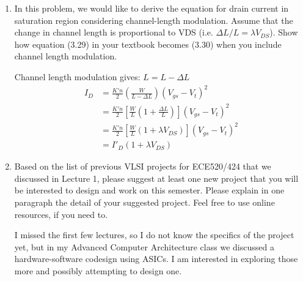 \documentclass[11pt]{article}
\begin{document}
\begin{enumerate}
    \item In this problem, we would like to derive the equation for drain current in saturation region considering channel-length modulation. Assume that the change in channel length is proportional to VDS (i.e. \(\Delta L / L = \lambda V_{DS}\)). Show how equation (3.29) in your textbook becomes (3.30) when you include channel length modulation.\vspace{1.5em}
    
    Channel length modulation gives: \( L = L - \Delta L\)
    \begin{align*}
        I_D &= \frac{K'n}{2} \left(\frac{W}{L-\Delta L}\right)\left(V_{gs}-V_t\right)^2\\[1em]
        &= \frac{K'n}{2}\left[ \frac{W}{L}\left(1+\frac{\Delta L}{L}\right)\right]\left(V_{gs}-V_t\right)^2\\[1em]
        &= \frac{K'n}{2}\left[ \frac{W}{L}\left(1+\lambda V_{DS}\right)\right]\left(V_{gs}-V_t\right)^2\\[1em]
        &= I'_D \left(1+\lambda V_{DS}\right)
    \end{align*}
    \item Based on the list of previous VLSI projects for ECE520/424 that we discussed in Lecture 1, please suggest at least one new project that you will be interested to design and work on this semester. Please explain in one paragraph the detail of your suggested project. Feel free to use online resources, if you need to.\vspace{1.5em}
    
    I missed the first few lectures, so I do not know the specifics of the project yet, but in my Advanced Computer Architecture class we discussed a hardware-software codesign using ASICs. I am interested in exploring those more and possibly attempting to design one.
\end{enumerate}

\end{document}
